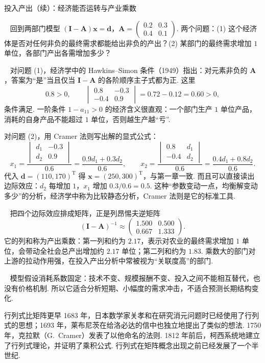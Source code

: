 \documentclass[lang=cn,10.5pt,scheme=chinese,toc=twocol,section,chinesefont=nofont,
twoside,citestyle=gb7714-2015,bibstyle=gb7714-2015]{elegantbook}
\DeclareRobustCommand{\textbf}[1]{{\lnsemiboldlatin\lnsemiboldcjk #1}}
\newcommand{\vv}[1]{\boldsymbol{#1}}
\newcommand{\trans}{\mathrm{T}}             %
\numberwithin{equation}{section}   %
\newcommand{\mstep}[1]{\par\smallskip\noindent\textbf{【#1】}\ }
\begin{document}
\begin{modelbox}{投入产出（续）：经济能否运转与产业乘数}
  \mstep{问题} 回到两部门模型 $(\vv I-\vv A)\vv x=\vv d$，$\vv A=
    \begin{pmatrix}
      0.2 & 0.3 \\0.4&0.1
    \end{pmatrix}
  $. 两个问题：(1) 这个经济体是否\textbf{对任何}非负的最终需求都能给出非负的产出？(2) 某部门的最终需求增加 $1$ 单位，各部门产出各需增加多少？

  \mstep{模型与求解} 对问题 (1)，经济学中的 \textbf{Hawkins–Simon 条件}（1949）指出：对元素非负的 $\vv A$，答案为“是”当且仅当 $\vv I-\vv A$ 的各阶顺序主子式都为正. 这里
  \[0.8>0,\qquad
    \begin{vmatrix}
      0.8 & -0.3 \\-0.4&0.9
    \end{vmatrix}
    =0.72-0.12=0.60>0,\]
  条件满足. 一阶条件 $1-a_{11}>0$ 的经济含义很直观：一个部门生产 $1$ 单位产品，消耗的自身产品不能超过 $1$ 单位，否则越生产越“亏”.

  对问题 (2)，用 Cramer 法则写出解的显式公式：
  \[
    x_1=\frac{
      \begin{vmatrix}
        d_1 & -0.3 \\d_2&0.9
      \end{vmatrix}
    }{0.6}=\frac{0.9d_1+0.3d_2}{0.6},\qquad
    x_2=\frac{
      \begin{vmatrix}
        0.8 & d_1 \\-0.4&d_2
      \end{vmatrix}
    }{0.6}=\frac{0.4d_1+0.8d_2}{0.6}.
  \]
  代入 $\vv d=(110,170)^\trans$ 得 $\vv x=(250,300)^\trans$，与第一章一致. 而且可以直接读出\textbf{边际效应}：$d_2$ 每增加 $1$，$x_1$ 增加 $0.3/0.6=0.5$. 这种“参数变动一点，均衡解变动多少”的分析，经济学中称为\textbf{比较静态分析}，Cramer 法则是它的标准工具.

  \mstep{解读} 把四个边际效应排成矩阵，正是列昂惕夫逆矩阵
  \[(\vv I-\vv A)^{-1}\approx
    \begin{pmatrix}
      1.500 & 0.500 \\0.667&1.333
    \end{pmatrix}
    .\]
  它的列和称为\textbf{产出乘数}：第一列和约为 $2.17$，表示对农业的最终需求增加 $1$ 单位，会带动全社会总产出增加约 $2.17$ 单位；第二列和约为 $1.83$. 乘数大的部门对上游的拉动作用强，在投入产出分析中常被视为“关联度高”的部门.

  \mstep{局限} 模型假设消耗系数固定：技术不变、规模报酬不变、投入之间不能相互替代，也没有价格机制. 所以它适合分析短期、小幅度的需求冲击，不适合预测长期结构变化.
\end{modelbox}
\begin{historybox}{行列式比矩阵更早}
  1683 年，日本数学家关孝和在研究消元问题时已经使用了行列式的思想\cite{seki1683kaifukudai,kline1972mathematical}；1693 年，莱布尼茨在给洛必达的信中也独立地提出了类似的想法\cite{muir1906theory}. 1750 年，克拉默（G.~Cramer）发表了以他命名的法则\cite{cramer1750introduction}. 1812 年前后，柯西系统地建立了行列式理论，并证明了乘积公式\cite{cauchy1815memoire}. 行列式在矩阵概念出现之前已经发展了一个半世纪.
\end{historybox}
\end{document}

